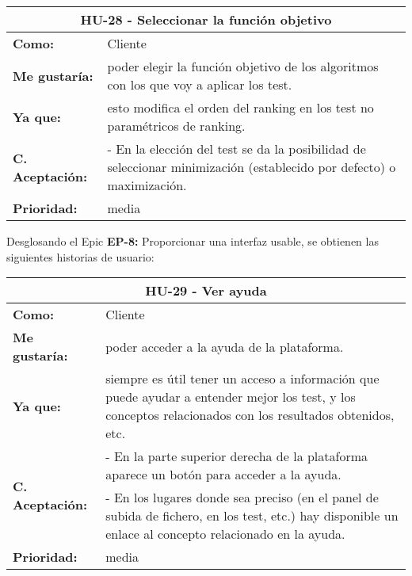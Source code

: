 
\begin{table}[H]
	\begin{tabular}{| p{3cm}| p{11cm} |}
		\hline
		\multicolumn{2}{|c|}{\textbf{HU-28} - Seleccionar la función objetivo} \\ \hline
		\textbf{Como:} & Cliente \\ \hline
		\textbf{Me gustaría:} & poder elegir la función objetivo de los algoritmos con los que voy a aplicar los test. \\ \hline
		\textbf{Ya que:} & esto modifica el orden del ranking en los test no paramétricos de ranking. \\ \hline
		\textbf{C. Aceptación:} & - En la elección del test se da la posibilidad de seleccionar minimización (establecido por defecto) o maximización.  \\ \hline
		\textbf{\textbf{Prioridad:}} & media \\ \hline
	\end{tabular}
\end{table}


\clearpage
Desglosando el Epic \textbf{EP-8:} Proporcionar una interfaz usable, se obtienen las siguientes historias de usuario:

\begin{table}[H]
	\begin{tabular}{| p{3cm}| p{11cm} |}
		\hline
		\multicolumn{2}{|c|}{\textbf{HU-29} - Ver ayuda} \\ \hline
		\textbf{Como:} & Cliente \\ \hline
		\textbf{Me gustaría:} & poder acceder a la ayuda de la plataforma. \\ \hline
		\textbf{Ya que:} & siempre es útil tener un acceso a información que puede ayudar a entender mejor los test, y los conceptos relacionados con los resultados obtenidos, etc. \\ \hline
		\multirow{2}{11cm}{\textbf{C. Aceptación:}} & - En la parte superior derecha de la plataforma aparece un botón para acceder a la ayuda. \\
		& - En los lugares donde sea preciso (en el panel de subida de fichero, en los test, etc.) hay disponible un enlace al concepto relacionado en la ayuda. \\ \hline
		\textbf{\textbf{Prioridad:}} & media \\ \hline
	\end{tabular}
\end{table}

